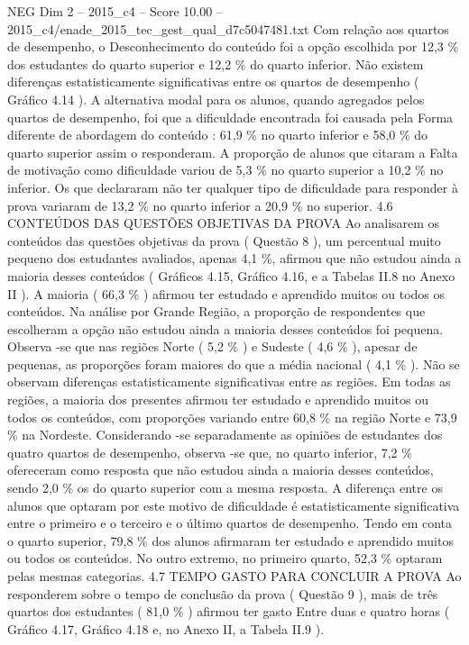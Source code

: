 \begin{textsample}{NEG Dim 2 – 2015\_c4 – Score 10.00 – 2015\_c4/enade\_2015\_tec\_gest\_qual\_d7c5047481.txt}
Com relação aos quartos de desempenho, o Desconhecimento do conteúdo foi a opção escolhida por 12,3 \% dos estudantes do quarto superior e 12,2 \% do quarto inferior.
Não existem diferenças estatisticamente significativas entre os quartos de desempenho ( Gráfico 4.14 ).
A alternativa modal para os alunos, quando agregados pelos quartos de desempenho, foi que a dificuldade encontrada foi causada pela Forma diferente de abordagem do conteúdo : 61,9 \% no quarto inferior e 58,0 \% do quarto superior assim o responderam.
A proporção de alunos que citaram a Falta de motivação como dificuldade variou de 5,3 \% no quarto superior a 10,2 \% no inferior.
Os que declararam não ter qualquer tipo de dificuldade para responder à prova variaram de 13,2 \% no quarto inferior a 20,9 \% no superior. 4.6 CONTEÚDOS DAS QUESTÕES OBJETIVAS DA PROVA Ao analisarem os conteúdos das questões objetivas da prova ( Questão 8 ), um percentual muito pequeno dos estudantes avaliados, apenas 4,1 \%, afirmou que não estudou ainda a maioria desses conteúdos ( Gráficos 4.15, Gráfico 4.16, e a Tabelas II.8 no Anexo II ).
A maioria ( 66,3 \% ) afirmou ter estudado e aprendido muitos ou todos os conteúdos.
Na análise por Grande Região, a proporção de respondentes que escolheram a opção não estudou ainda a maioria desses conteúdos foi pequena.
Observa -se que nas regiões Norte ( 5,2 \% ) e Sudeste ( 4,6 \% ), apesar de pequenas, as proporções foram maiores do que a média nacional ( 4,1 \% ).
Não se observam diferenças estatisticamente significativas entre as regiões.
Em todas as regiões, a maioria dos presentes afirmou ter estudado e aprendido muitos ou todos os conteúdos, com proporções variando entre 60,8 \% na região Norte e 73,9 \% na Nordeste.
Considerando -se separadamente as opiniões de estudantes dos quatro quartos de desempenho, observa -se que, no quarto inferior, 7,2 \% ofereceram como resposta que não estudou ainda a maioria desses conteúdos, sendo 2,0 \% os do quarto superior com a mesma resposta.
A diferença entre os alunos que optaram por este motivo de dificuldade é estatisticamente significativa entre o primeiro e o terceiro e o último quartos de desempenho.
Tendo em conta o quarto superior, 79,8 \% dos alunos afirmaram ter estudado e aprendido muitos ou todos os conteúdos.
No outro extremo, no primeiro quarto, 52,3 \% optaram pelas mesmas categorias. 4.7 TEMPO GASTO PARA CONCLUIR A PROVA Ao responderem sobre o tempo de conclusão da prova ( Questão 9 ), mais de três quartos dos estudantes ( 81,0 \% ) afirmou ter gasto Entre duas e quatro horas ( Gráfico 4.17, Gráfico 4.18 e, no Anexo II, a Tabela II.9 ).

\end{textsample}
